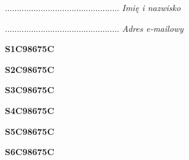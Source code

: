 \begin{turn}{90}\begin{minipage}{\linewidth} \vspace{20mm} ................................................  \textit{Imię i nazwisko}\end{minipage}\end{turn}

\begin{turn}{90}\begin{minipage}{\linewidth} \vspace{20mm} ................................................  \textit{Adres e-mailowy}\end{minipage}\end{turn}

\begin{turn}{90}\huge \begin{minipage}{\linewidth} \vspace{10mm}\textbf{S1C98675C}\end{minipage}\end{turn}

\begin{turn}{90}\huge \begin{minipage}{\linewidth} \vspace{10mm}\textbf{S2C98675C}\end{minipage}\end{turn}

\begin{turn}{90}\huge \begin{minipage}{\linewidth} \vspace{10mm}\textbf{S3C98675C}\end{minipage}\end{turn}

\begin{turn}{90}\huge \begin{minipage}{\linewidth} \vspace{10mm}\textbf{S4C98675C}\end{minipage}\end{turn}

\begin{turn}{90}\huge \begin{minipage}{\linewidth} \vspace{10mm}\textbf{S5C98675C}\end{minipage}\end{turn}

\begin{turn}{90}\huge \begin{minipage}{\linewidth} \vspace{10mm}\textbf{S6C98675C}\end{minipage}\end{turn}

